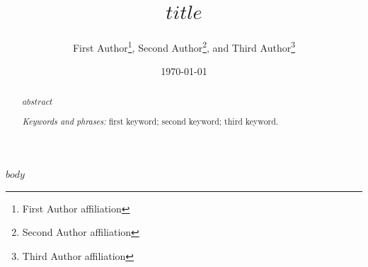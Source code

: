 \documentclass[a4paper, 12pt]{article}
\title{$title$}
\author{First Author\footnote{First Author affiliation}, \; Second Author\footnote{Second Author affiliation}, \; and Third Author\footnote{Third Author affiliation}}
\date{
\today
}
\theoremstyle{plain}
\theoremstyle{definition}
\theoremstyle{remark}
\begin{document}
\maketitle

\thispagestyle{fancy}

\begin{abstract}
$abstract$

\smallskip

\emph{Keywords and phrases:} first keyword; second keyword; third keyword.
\end{abstract}


$body$


















%

\end{document}

